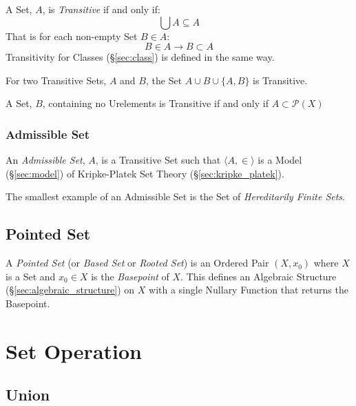 A Set, $A$, is \emph{Transitive} if and only if:
\[
  \bigcup A \subseteq A
\]
That is for each non-empty Set $B \in A$:
\[
  B \in A \rightarrow B \subset A
\]
Transitivity for Classes (\S\ref{sec:class}) is defined in the same
way.

For two Transitive Sets, $A$ and $B$, the Set $A \cup B \cup \{A,B\}$
is Transitive.

A Set, $B$, containing no Urelements is Transitive if and only if $A
\subset \mathcal{P}(X)$



\subsubsection{Admissible Set}\label{sec:admissible_set}

An \emph{Admissible Set}, $A$, is a Transitive Set such that $\langle
A, \in \rangle$ is a Model (\S\ref{sec:model}) of Kripke-Platek Set
Theory (\S\ref{sec:kripke_platek}).

The smallest example of an Admissible Set is the Set of
\emph{Hereditarily Finite Sets}. %



\subsection{Pointed Set}\label{sec:pointed_set}

A \emph{Pointed Set} (or \emph{Based Set} or \emph{Rooted Set}) is an
Ordered Pair $(X, x_0)$ where $X$ is a Set and $x_0 \in X$ is the
\emph{Basepoint} of $X$. This defines an Algebraic Structure
(\S\ref{sec:algebraic_structure}) on $X$ with a single Nullary
Function that returns the Basepoint.



\section{Set Operation}\label{sec:set_operation}

\subsection{Union}\label{sec:union}

